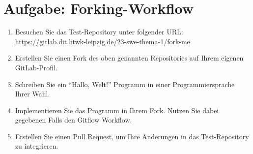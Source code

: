 
\section{Aufgabe: Forking\hyp Workflow}
\label{sec:task:gitflow}


\begin{enumerate}
    \item Besuchen Sie das Test\hyp Repository unter folgender URL: \url{https://gitlab.dit.htwk-leipzig.de/23-swe-thema-1/fork-me}
    
    \item Erstellen Sie einen Fork des oben genannten Repositories auf Ihrem eigenen GitLab\hyp Profil.
  
    \item Schreiben Sie ein \enquote{Hallo, Welt!} Programm in einer Programmiersprache Ihrer Wahl.
  
    \item Implementieren Sie das Programm in Ihrem Fork. Nutzen Sie dabei gegebenen Falls den Gitflow Workflow.
  
    \item Erstellen Sie einen Pull Request, um Ihre Änderungen in das Test\hyp Repository zu integrieren.
  
  \end{enumerate}
